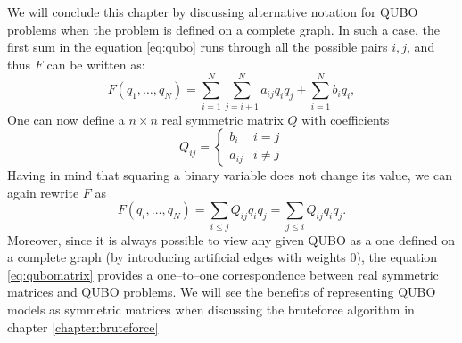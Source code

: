 We will conclude this chapter by discussing alternative notation for QUBO
problems when the problem is defined on a complete graph. In such a case, the
first sum in the equation \eqref{eq:qubo} runs through all the possible pairs
${i, j}$, and thus $F$ can be written as:
\begin{equation}
  \label{eq:qubocomplete}
  F(q_1, \ldots, q_N) =  \sum_{i=1}^N \sum_{j=i+1}^N a_{ij} q_i q_j + \sum_{i=1}^N b_iq_i,
\end{equation}
One can now define a $n \times n$ real symmetric matrix $Q$ with coefficients
\begin{equation}
  Q_{ij} = \begin{cases}
    b_{i}  & i = j   \\
    a_{ij} & i \ne j
  \end{cases}
\end{equation}
Having in mind that squaring a binary variable does not change its value, we can again
rewrite $F$ as
\begin{equation}
  \label{eq:qubomatrix}
  F(q_{i}, \ldots, q_{N}) = \sum_{i \le j} Q_{ij} q_{i}q_{j} = \sum_{j \le i} Q_{ij} q_{i}q_{j}.
\end{equation}
Moreover, since it is always possible to view any given QUBO as a one defined on a complete graph
(by introducing artificial edges with weights 0), the equation \eqref{eq:qubomatrix} provides
a one--to--one correspondence between real symmetric matrices and QUBO problems. We will see
the benefits of representing QUBO models as symmetric matrices when discussing the bruteforce
algorithm in chapter \ref{chapter:bruteforce}

